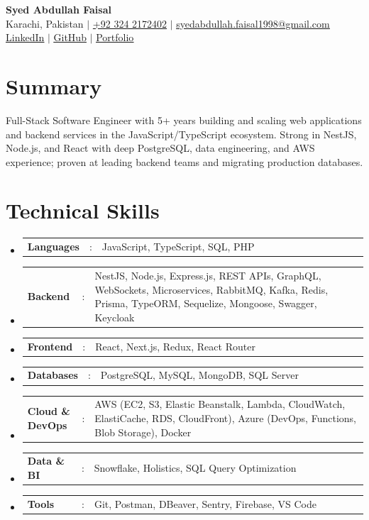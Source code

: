 \documentclass[a4paper,11pt]{article}
\newcommand{\resumeSectionType}[3]{
  \item\begin{tabular*}{0.96\textwidth}[t]{
    p{0.16\linewidth}p{0.02\linewidth}p{0.82\linewidth}
  }
    \textbf{#1} & #2 & #3
  \end{tabular*}\vspace{-2pt}
}
\newcommand{\resumeHeadingListStart}{\begin{itemize}[leftmargin=0in, label={}, topsep=2pt, itemsep=0pt]}
\newcommand{\resumeHeadingListEnd}{\end{itemize}}
\begin{document}
\begin{center}
  {\Huge \textbf{Syed Abdullah Faisal}} \\ \vspace{4pt}
  \small
  Karachi, Pakistan $|$
  \href{tel:+923242172402}{+92 324 2172402} $|$
  \href{mailto:syedabdullah.faisal1998@gmail.com}{\underline{syedabdullah.faisal1998@gmail.com}} \\ \vspace{2pt}
  \href{https://www.linkedin.com/in/syed-abdullah-faisal-647b59202/}{\underline{LinkedIn}} $|$
  \href{https://github.com/abdullah-0786}{\underline{GitHub}} $|$
  \href{https://abdullah-resume.web.app/}{\underline{Portfolio}}
\end{center}
\vspace{4pt}

\section{Summary}
\small{
Full-Stack Software Engineer with 5+ years building and scaling web applications and backend services in the JavaScript/TypeScript ecosystem. Strong in NestJS, Node.js, and React with deep PostgreSQL, data engineering, and AWS experience; proven at leading backend teams and migrating production databases.
}
\vspace{2pt}

\section{Technical Skills}
\resumeHeadingListStart{}
  \resumeSectionType{Languages}{:}{JavaScript, TypeScript, SQL, PHP}
  \resumeSectionType{Backend}{:}{NestJS, Node.js, Express.js, REST APIs, GraphQL, WebSockets, Microservices, RabbitMQ, Kafka, Redis, Prisma, TypeORM, Sequelize, Mongoose, Swagger, Keycloak}
  \resumeSectionType{Frontend}{:}{React, Next.js, Redux, React Router}
  \resumeSectionType{Databases}{:}{PostgreSQL, MySQL, MongoDB, SQL Server}
  \resumeSectionType{Cloud \& \mbox{DevOps}}{:}{AWS (EC2, S3, Elastic Beanstalk, Lambda, CloudWatch, ElastiCache, RDS, CloudFront), Azure (\mbox{DevOps}, Functions, Blob Storage), Docker}
  \resumeSectionType{Data \& BI}{:}{Snowflake, Holistics, SQL Query Optimization}
  \resumeSectionType{Tools}{:}{Git, Postman, DBeaver, Sentry, Firebase, VS Code}
\resumeHeadingListEnd{}

\end{document}
